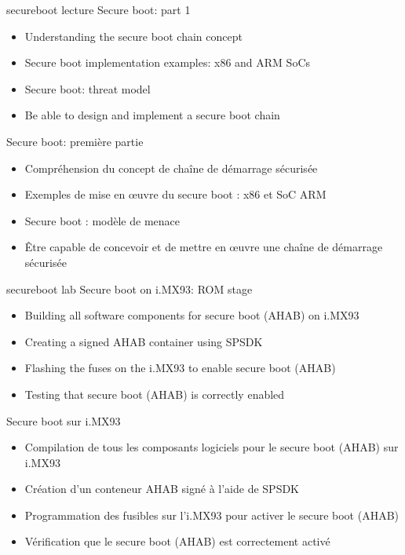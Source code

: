 {secureboot}
{lecture}
{Secure boot: part 1}
{
  \begin{itemize}
  \item Understanding the secure boot chain concept
  \item Secure boot implementation examples: x86 and ARM SoCs
  \item Secure boot: threat model
  \item Be able to design and implement a secure boot chain
  \end{itemize}
}
{Secure boot: première partie}
{
  \begin{itemize}
  \item Compréhension du concept de chaîne de démarrage sécurisée
  \item Exemples de mise en œuvre du secure boot : x86 et SoC ARM
  \item Secure boot : modèle de menace
  \item Être capable de concevoir et de mettre en œuvre une chaîne de
    démarrage sécurisée
  \end{itemize}
}

{secureboot}
{lab}
{Secure boot on i.MX93: ROM stage}
{
  \begin{itemize}
  \item Building all software components for secure boot (AHAB) on
    i.MX93
  \item Creating a signed AHAB container using SPSDK
  \item Flashing the fuses on the i.MX93 to enable secure boot (AHAB)
  \item Testing that secure boot (AHAB) is correctly enabled
  \end{itemize}
}
{Secure boot sur i.MX93}
{
  \begin{itemize}
  \item Compilation de tous les composants logiciels pour le secure
    boot (AHAB) sur i.MX93
  \item Création d’un conteneur AHAB signé à l’aide de SPSDK
  \item Programmation des fusibles sur l’i.MX93 pour activer le secure
    boot (AHAB)
  \item Vérification que le secure boot (AHAB) est correctement activé
  \end{itemize}
}

